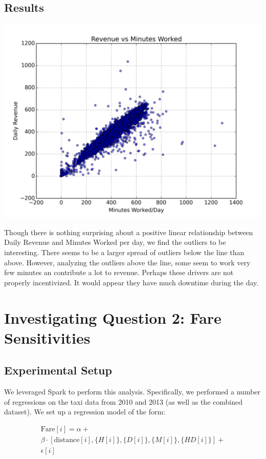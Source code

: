\documentclass[twoside]{article}
\begin{document}
\begin{multicols}{2}
\subsection{Results}
\includegraphics[scale=.35]{Minutes_v_Rev.png}

Though there is nothing surprising about a positive linear relationship between Daily Revenue and Minutes Worked per day, we find the outliers to be interesting. There seems to be a larger spread of outliers below the line than above. However, analyzing the outliers above the line, some seem to work very few minutes an contribute a lot to revenue. Perhaps these drivers are not properly incentivized. It would appear they have much downtime during the day. 

\section{Investigating Question 2: Fare Sensitivities}

\subsection{Experimental Setup}

We leveraged Spark to perform this analysis. Specifically, we performed a number of regressions on the taxi data from 2010 and 2013 (as well as the combined dataset). We set up a regression model of the form:


\begin{multline*}
\text{Fare}[i] = \alpha + \\
	\beta \cdot [\text{distance}[i], \{H[i]\}, \{D[i]\}, \{M[i]\},\{HD[i]\}] +\\
	 \epsilon[i]
\end{multline*}


\end{multicols}
\end{document}
